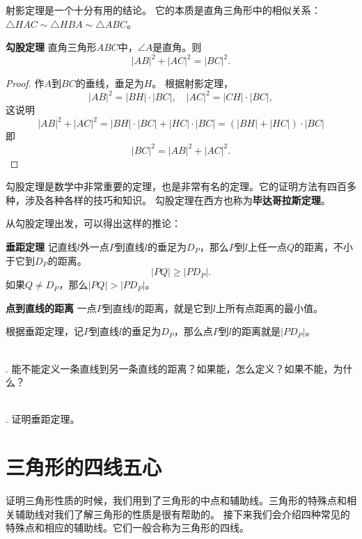\documentclass[12pt,UTF8]{ctexbook}
\begin{document}
射影定理是一个十分有用的结论。
它的本质是直角三角形中的相似关系：$\triangle HAC \sim \triangle HBA \sim \triangle ABC$。

\begin{tm}{\textbf{勾股定理}}\label{tm:0-2-3}
    直角三角形$ABC$中，$\angle A$是直角。则
    $$|AB|^2+|AC|^2 = |BC|^2.$$
\end{tm}
\begin{proof}
    作$A$到$BC$的垂线，垂足为$H$。
    根据射影定理，    
    $$ |AB|^2 = |BH|\cdot |BC|, \quad |AC|^2 = |CH|\cdot |BC|,$$
    这说明
    $$ |AB|^2+|AC|^2 = |BH|\cdot |BC| + |HC|\cdot |BC| = (|BH| + |HC|)\cdot |BC|$$
    即
    $$ |BC|^2 = |AB|^2+|AC|^2.$$
\end{proof}

勾股定理是数学中非常重要的定理，也是非常有名的定理。它的证明方法有四百多种，涉及各种各样的技巧和知识。
勾股定理在西方也称为\textbf{毕达哥拉斯定理}。

从勾股定理出发，可以得出这样的推论：
\begin{cor}{\textbf{垂距定理}}\label{cr:0-2-0}
    记直线$l$外一点$P$到直线$l$的垂足为$D_P$，那么$P$到$l$上任一点$Q$的距离，不小于它到$D_P$的距离。
    $$ |PQ | \geqslant |PD_P|.$$
    如果$Q \neq D_P$，那么$|PQ| > |PD_P|$。
\end{cor}

\begin{df}{\textbf{点到直线的距离}}\label{df:0-2-0}
    一点$P$到直线$l$的距离，就是它到$l$上所有点距离的最小值。
\end{df}
根据垂距定理，记$P$到直线$l$的垂足为$D_P$，那么点$P$到$l$的距离就是$|PD_P|$。

\begin{sk}\label{sk:0-2-0}
    \mbox{} \\
    . 能不能定义一条直线到另一条直线的距离？如果能，怎么定义？如果不能，为什么？
\end{sk}

\begin{xt}\label{xt:0-2-0} 
    \mbox{} \\
    . 证明垂距定理。\\

\end{xt}

\chapter{三角形的四线五心}
证明三角形性质的时候，我们用到了三角形的中点和辅助线。三角形的特殊点和相关辅助线对我们了解三角形的性质是很有帮助的。
接下来我们会介绍四种常见的特殊点和相应的辅助线。它们一般合称为三角形的四线。
\end{document}
